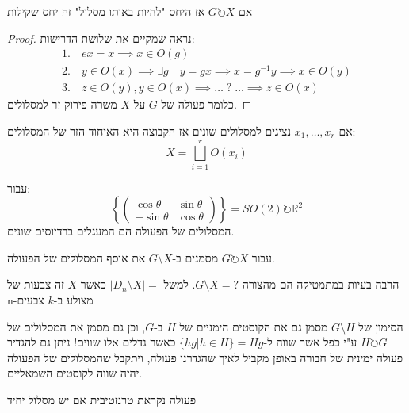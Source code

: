 \documentclass{tstextbook}
\begin{document}
\begin{proposition}
אם \(G\circlearrowright X\) אז היחס "להיות באותו מסלול" זה יחס שקילות

\end{proposition}
\begin{proof}
נראה שמקיים את שלושת הדרישות:
$$\begin{gather}1.\quad  ex=x \implies x \in O(g) \\2.\quad  y\in O(x)\implies \exists g\quad y=gx\implies x=g^{-1}y\implies x \in O(y) \\3.\quad z\in O(y),y\in O(x)\implies \dots \;?\;\dots\implies z\in O(x)
\end{gather}$$
כלומר פעולה של \(G\) על \(X\) משרה פירוק זר למסלולים.

\end{proof}
\begin{corollary}
אם \(x_{1},\dots,x_{r}\) נציגים למסלולים שונים אז הקבוצה היא האיחוד הזר של המסלולים:
$$X=\bigsqcup_{i=1}^r O(x_{i})$$

\end{corollary}
\begin{example}
עבור:
$$\left\{ \begin{pmatrix}\cos \theta & \sin \theta \\-\sin \theta  & \cos \theta
\end{pmatrix} \right\}=SO(2)\circlearrowright\mathbb{R}^2$$
המסלולים של הפעולה הם המעגלים ברדיוסים שונים. 

\end{example}
\begin{symbolize}
עבור \(G\circlearrowright X\) מסמנים ב-\(G\setminus X\) את אוסף המסלולים של הפעולה.

\end{symbolize}
\begin{remark}
הרבה בעיות במתמטיקה הם מהצורה \(G\setminus X=?\). למשל \(|D_{n}\setminus X |=\) כאשר \(X\) זה צבעות של n-מצולע ב-\(k\) צבעים

\end{remark}
\begin{remark}
הסימון של \(G\setminus H\) מסמן גם את הקוסטים הימניים של \(H\) ב-\(G\), וכן גם מסמן את המסלולים של \(H\circlearrowright G\) ע"י כפל אשר שווה ל-\(\{ hg|h\in H \}=Hg\) כאשר גדלים אלו שווים!
ניתן גם להגדיר פעולה ימינית של חבורה באופן מקביל לאיך שהגדרנו פעולה, ויתקבל שהמסלולים של הפעולה יהיה שווה לקוסטים השמאליים.

\end{remark}
\begin{definition}
פעולה נקראת טרנזטיבית אם יש מסלול יחיד

\end{definition}
\end{document}
